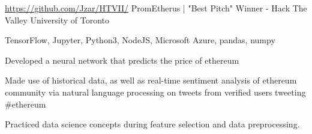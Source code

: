 

\begin{cventries}

  \cventry
    {\url{https://github.com/Jzar/HTVII/}} %
    {PromEtherus | "Best Pitch" Winner - Hack The Valley } %
    {University of Toronto} %
    {} %
    {
      \begin{cvitems} %
        \item {TensorFlow, Jupyter, Python3, NodeJS, Microsoft Azure, pandas, numpy}
        \item {Developed a neural network that predicts the price of ethereum}
	\item{ Made use of historical data, as well as real-time sentiment analysis of ethereum community via natural language processing on tweets from verified 
users tweeting \#ethereum}
        \item {Practiced data science concepts during feature selection and data preprocessing. }
      \end{cvitems}
    }


\end{cventries}
